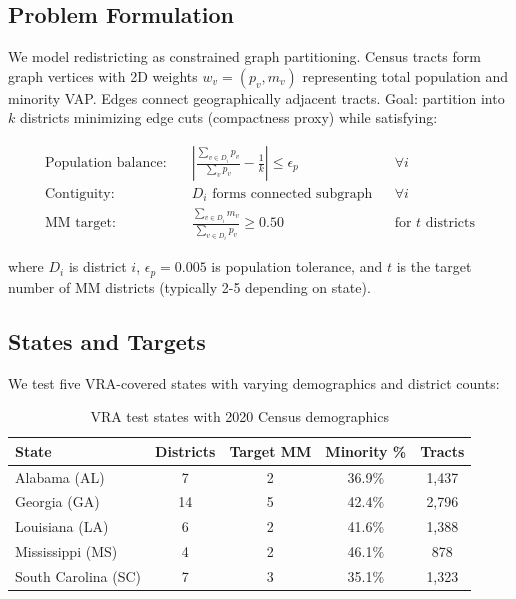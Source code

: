 \subsection{Problem Formulation}

We model redistricting as constrained graph partitioning. Census tracts form graph vertices with 2D weights $w_v = (p_v, m_v)$ representing total population and minority VAP. Edges connect geographically adjacent tracts. Goal: partition into $k$ districts minimizing edge cuts (compactness proxy) while satisfying:

\begin{align}
\text{Population balance:} \quad & \left|\frac{\sum_{v \in D_i} p_v}{\sum_v p_v} - \frac{1}{k}\right| \leq \epsilon_p && \forall i \label{eq:pop}\\
\text{Contiguity:} \quad & D_i \text{ forms connected subgraph} && \forall i \label{eq:contig}\\
\text{MM target:} \quad & \frac{\sum_{v \in D_i} m_v}{\sum_{v \in D_i} p_v} \geq 0.50 && \text{for } t \text{ districts} \label{eq:vra}
\end{align}

where $D_i$ is district $i$, $\epsilon_p = 0.005$ is population tolerance, and $t$ is the target number of MM districts (typically 2-5 depending on state).

\subsection{States and Targets}

We test five VRA-covered states with varying demographics and district counts:

\begin{table}[h]
\centering
\begin{tabular}{lcccc}
\toprule
State & Districts & Target MM & Minority \% & Tracts \\
\midrule
Alabama (AL) & 7 & 2 & 36.9\% & 1,437 \\
Georgia (GA) & 14 & 5 & 42.4\% & 2,796 \\
Louisiana (LA) & 6 & 2 & 41.6\% & 1,388 \\
Mississippi (MS) & 4 & 2 & 46.1\% & 878 \\
South Carolina (SC) & 7 & 3 & 35.1\% & 1,323 \\
\bottomrule
\end{tabular}
\caption{VRA test states with 2020 Census demographics}
\label{tab:states}
\end{table}

